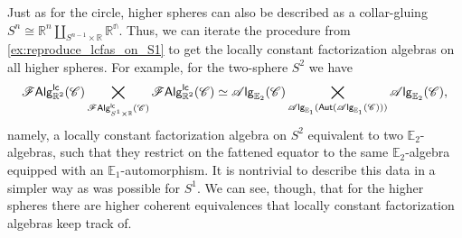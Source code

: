 \documentclass[../text]{subfiles}
\begin{document}
\begin{example}\label{ex:lcfas_on_S^n}
    Just as for the circle, higher spheres can also be described as a collar-gluing $S^n \cong \mathbb{R}^n \coprod_{S^{n-1} \times \mathbb{R}} \mathbb{R^n}$. Thus, we can iterate the procedure from \cref{ex:reproduce_lcfas_on_S1} to get the locally constant factorization algebras on all higher spheres. For example, for the two-sphere $S^2$ we have
    \begin{equation}
        \mathscr{F} \mathsf{Alg}^{\mathsf{lc}}_{\mathbb{R}^2}(\mathscr{C}) \bigtimes_{\mathscr{F} \mathsf{Alg}^{\mathsf{lc}}_{S^1 \times \mathbb{R}}(\mathscr{C})} \mathscr{F} \mathsf{Alg}^{\mathsf{lc}}_{\mathbb{R}^2}(\mathscr{C}) \simeq \mathscr{A} \mathsf{lg}_{\mathbb{E}_2}(\mathscr{C}) \bigtimes_{\mathscr{A} \mathsf{lg}_{\mathbb{E}_1}( \mathsf{Aut} (\mathscr{A} \mathsf{lg}_{\mathbb{E}_1} (\mathscr{C}))) } \mathscr{A} \mathsf{lg}_{\mathbb{E}_2} (\mathscr{C}),
    \end{equation}
    namely, a locally constant factorization algebra on $S^2$ equivalent to two $\mathbb{E}_2$-algebras, such that they restrict on the fattened equator to the same $\mathbb{E}_2$-algebra equipped with an $\mathbb{E}_1$-automorphism. It is nontrivial to describe this data in a simpler way as was possible for $S^1$. We can see, though, that for the higher spheres there are higher coherent equivalences that locally constant factorization algebras keep track of.
\end{example}
\end{document}
